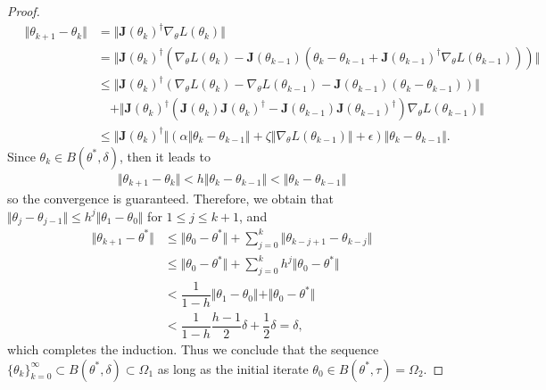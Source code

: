 \documentclass[a4paper, 11pt]{article}
\numberwithin{equation}{section}
\begin{document}
\begin{proof}
\begin{align}
\quad \Vert \theta_{k+1} - \theta_k \Vert &= \Vert \boldsymbol{J} (\theta_k)^{\dagger} \nabla_{\theta}L(\theta_k) \Vert \\
& = \Vert \boldsymbol{J} (\theta_k)^{\dagger}\left( \nabla_{\theta}L(\theta_k) - \boldsymbol{J} (\theta_{k-1})  \left(\theta_k - \theta_{k-1} + \boldsymbol{J}(\theta_{k-1})^{\dagger}  \nabla_{\theta}L(\theta_{k-1}) \right) \right)  \Vert \\ 
&\leq \Vert  \boldsymbol{J} (\theta_k)^{\dagger} \left( \nabla_{\theta}L(\theta_k)  - \nabla_{\theta}L(\theta_{k-1}) - \boldsymbol{J} (\theta_{k-1}) (\theta_k-\theta_{k-1}) \right) \Vert \\ 
&\quad + \Vert \boldsymbol{J} (\theta_k)^{\dagger}  \left(\boldsymbol{J} (\theta_k) \boldsymbol{J} (\theta_k)^{\dagger} - \boldsymbol{J} (\theta_{k-1}) \boldsymbol{J} (\theta_{k-1})^{\dagger}  \right) \nabla_{\theta}L(\theta_{k-1}) \Vert \\ 
&\leq \Vert \boldsymbol{J} (\theta_k)^{\dagger} \Vert \left( \alpha \Vert \theta_k - \theta_{k-1} \Vert + \zeta \Vert \nabla_{\theta} L (\theta_{k-1})  \Vert + \epsilon \right) \Vert \theta_k - \theta_{k-1} \Vert.\label{3.44}
\end{align}
Since $\theta_{k} \in B(\theta^*,\delta)$, then it leads to 
\begin{align}\label{convergence}
\Vert \theta_{k+1} - \theta_k \Vert < h \Vert \theta_k - \theta_{k-1} \Vert < \Vert \theta_k - \theta_{k-1} \Vert
\end{align}
so the convergence is guaranteed. Therefore, we obtain that $\Vert \theta_{j} - \theta_{j-1} \Vert \leq h^j \Vert \theta_{1} - \theta_{0} \Vert $ for $1\leq j \leq k+1$, and
\begin{align}
\Vert \theta_{k+1} - \theta^* \Vert &\leq \Vert \theta_0 - \theta^* \Vert + \sum_{j=0}^{k} \Vert  \theta_{k-j+1} - \theta_{k-j} \Vert \\
&\leq \Vert \theta_0 - \theta^* \Vert + \sum_{j=0}^{k} h^j \Vert  \theta_{0} - \theta^* \Vert \\
&< \dfrac{1}{1-h} \Vert  \theta_{1} - \theta_{0} \Vert +\Vert  \theta_{0} - \theta^* \Vert  \\
&< \dfrac{1}{1-h}\dfrac{h-1}{2}\delta + \dfrac{1}{2}\delta  =  \delta,
\end{align}
which completes the induction. Thus we conclude that the sequence $\lbrace \theta_k \rbrace_{k=0}^{\infty} \subset B(\theta^*, \delta) \subset \Omega_1 $ as long as the initial iterate $\theta_0 \in B(\theta^*, \tau) = \Omega_2$.



\end{proof}
\end{document}

